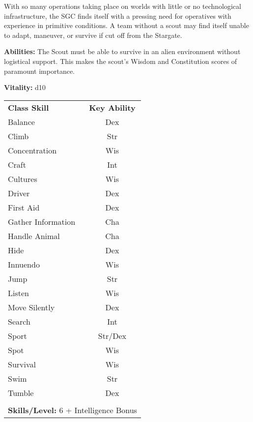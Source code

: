 \begin{multicols}{2}

With so many operations taking place on worlds with little or no technological infrastructure, the SGC finds itself with a pressing need for operatives with experience in primitive conditions. A team without a scout may find itself unable to adapt, maneuver, or survive if cut off from the Stargate.

\columnbreak

\textbf{Abilities:} The Scout must be able to survive in an alien environment without logistical support. This makes the scout's Wisdom and Constitution scores of paramount importance.

\textbf{Vitality:} d10

\end{multicols}

\begin{table}[htb]
\raggedright
\begin{tabular}{l c}
\textbf{Class Skill} & \textbf{Key Ability}\\

Balance & Dex\\
Climb & Str\\
Concentration & Wis\\
Craft & Int\\
Cultures & Wis\\
Driver & Dex\\
First Aid & Dex\\
Gather Information & Cha\\
Handle Animal & Cha\\
Hide & Dex\\
Innuendo & Wis\\
Jump & Str\\
Listen & Wis\\
Move Silently & Dex\\
Search & Int\\
Sport & Str/Dex\\
Spot & Wis\\
Survival & Wis\\
Swim & Str\\
Tumble & Dex\\

\multicolumn{2}{l}{\cellcolor{white}}\\
\multicolumn{2}{l}{\cellcolor{white}\textbf{Skills/Level:} 6 + Intelligence Bonus}\\
\end{tabular}
\end{table}

